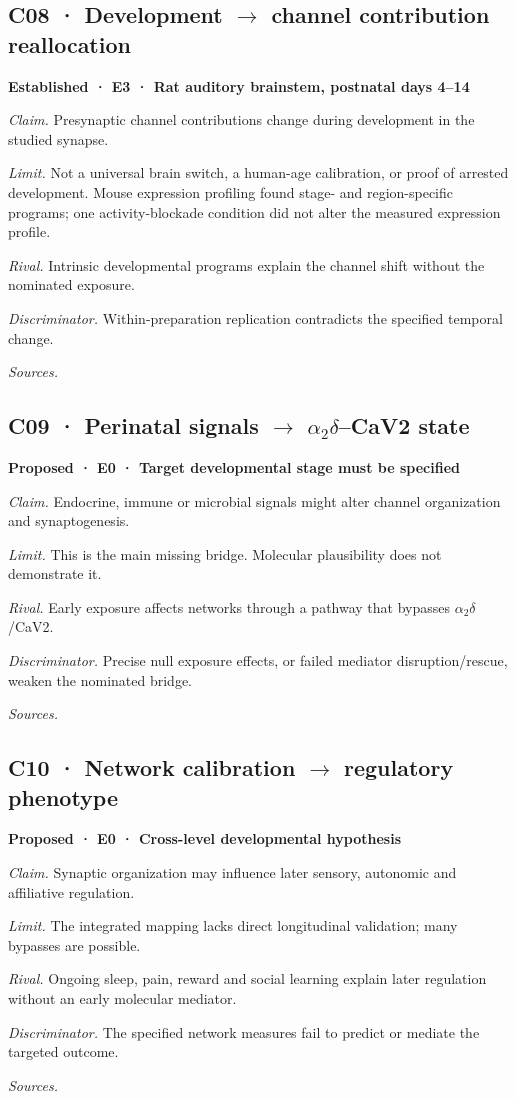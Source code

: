\subsection*{C08 · Development \ensuremath{\rightarrow} channel contribution reallocation}
\noindent\textbf{Established · E3 · Rat auditory brainstem, postnatal days 4–14}\par
\textit{Claim.} Presynaptic channel contributions change during development in the studied synapse.\par
\textit{Limit.} Not a universal brain switch, a human-age calibration, or proof of arrested development. Mouse expression profiling found stage- and region-specific programs; one activity-blockade condition did not alter the measured expression profile.\par
\textit{Rival.} Intrinsic developmental programs explain the channel shift without the nominated exposure.\par
\textit{Discriminator.} Within-preparation replication contradicts the specified temporal change.\par
\textit{Sources.} \cite{ref8,ref30}\par
\subsection*{C09 · Perinatal signals \ensuremath{\rightarrow} \ensuremath{\alpha_2\delta}–CaV2 state}
\noindent\textbf{Proposed · E0 · Target developmental stage must be specified}\par
\textit{Claim.} Endocrine, immune or microbial signals might alter channel organization and synaptogenesis.\par
\textit{Limit.} This is the main missing bridge. Molecular plausibility does not demonstrate it.\par
\textit{Rival.} Early exposure affects networks through a pathway that bypasses \ensuremath{\alpha_2\delta}/CaV2.\par
\textit{Discriminator.} Precise null exposure effects, or failed mediator disruption/rescue, weaken the nominated bridge.\par
\textit{Sources.} \cite{projP3,ref10,ref12}\par
\subsection*{C10 · Network calibration \ensuremath{\rightarrow} regulatory phenotype}
\noindent\textbf{Proposed · E0 · Cross-level developmental hypothesis}\par
\textit{Claim.} Synaptic organization may influence later sensory, autonomic and affiliative regulation.\par
\textit{Limit.} The integrated mapping lacks direct longitudinal validation; many bypasses are possible.\par
\textit{Rival.} Ongoing sleep, pain, reward and social learning explain later regulation without an early molecular mediator.\par
\textit{Discriminator.} The specified network measures fail to predict or mediate the targeted outcome.\par
\textit{Sources.} \cite{projP1,projP3,ref9,ref14,ref15}\par
